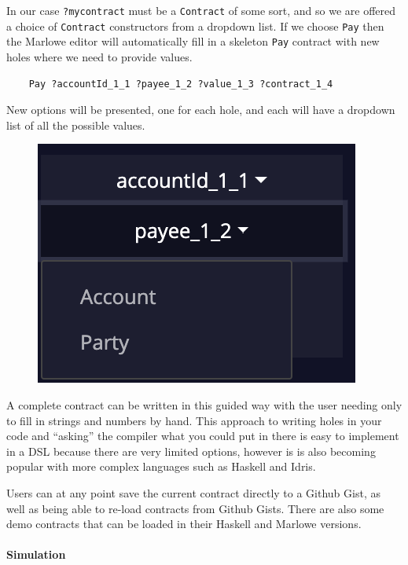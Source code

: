 \documentclass[runningheads]{llncs}
\renewcommand{\lstinline}[1]{\texttt{#1}}
\begin{document}
In our case \lstinline{?mycontract} must be a \lstinline{Contract} of some sort, and so we are offered a choice of \lstinline{Contract} constructors from a dropdown list. If we choose \lstinline{Pay} then the Marlowe editor will automatically fill in a skeleton \lstinline{Pay} contract with new holes where we need to provide values.
\begin{verbatim}
    Pay ?accountId_1_1 ?payee_1_2 ?value_1_3 ?contract_1_4
\end{verbatim}
New options will be presented, one for each hole, and each will have a dropdown list of all the possible values.

\begin{figure}
    \vspace*{-0.25in}
    \includegraphics[scale=0.2]{hole_options_2.png}
\end{figure}
A complete contract can be written in this guided way with the user needing only to fill in strings and numbers by hand. This approach to writing holes in your code and ``asking'' the compiler what you could put in there is easy to implement in a DSL because there are very limited options, however is is also becoming popular with more complex languages such as Haskell and Idris.

Users can at any point save the current contract directly to a Github Gist, as well as being able to re-load contracts from Github Gists. There are also some demo contracts that can be loaded in their Haskell and Marlowe versions.

\paragraph{Simulation}
\end{document}
